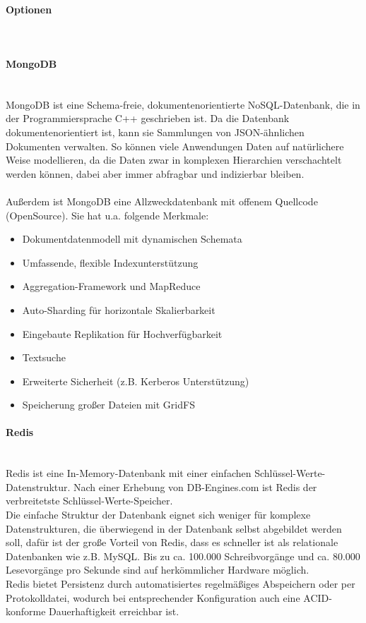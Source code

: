 \paragraph{Optionen} \mbox{}\\

\paragraph{MongoDB} \mbox{}\\
MongoDB ist eine Schema-freie, dokumentenorientierte NoSQL-Datenbank, die in der Programmiersprache C++ geschrieben ist. Da die Datenbank dokumentenorientiert ist, kann sie Sammlungen von JSON-\"ahnlichen Dokumenten verwalten. So k\"onnen viele Anwendungen Daten auf nat\"urlichere Weise modellieren, da die Daten zwar in komplexen Hierarchien verschachtelt werden k\"onnen, dabei aber immer abfragbar und indizierbar bleiben.\\\\
Au{\ss}erdem ist MongoDB eine Allzweckdatenbank mit offenem Quellcode (OpenSource).
Sie hat u.a. folgende Merkmale:

\begin{itemize}
	\item Dokumentdatenmodell mit dynamischen Schemata
	\item Umfassende, flexible Indexunterst\"utzung
	\item Aggregation-Framework und MapReduce
	\item Auto-Sharding f\"ur horizontale Skalierbarkeit
	\item Eingebaute Replikation f\"ur Hochverf\"ugbarkeit
	\item Textsuche
	\item Erweiterte Sicherheit (z.B. Kerberos Unterst\"utzung)
	\item Speicherung gro{\ss}er Dateien mit GridFS
\end{itemize}

\paragraph{Redis} \mbox{}\\
Redis ist eine In-Memory-Datenbank mit einer einfachen Schl\"ussel-Werte-Datenstruktur. Nach einer Erhebung von DB-Engines.com ist Redis der verbreitetste Schl\"ussel-Werte-Speicher.\\
Die einfache Struktur der Datenbank eignet sich weniger f\"ur komplexe Datenstrukturen, die \"uberwiegend in der Datenbank selbst abgebildet werden soll, daf\"ur ist der gro{\ss}e Vorteil von Redis, dass es schneller ist als relationale Datenbanken wie z.B. MySQL. Bis zu ca. 100.000 Schreibvorg\"ange und ca. 80.000 Lesevorg\"ange pro Sekunde sind auf herk\"ommlicher Hardware m\"oglich.\\
Redis bietet Persistenz durch automatisiertes regelm\"a{\ss}iges Abspeichern oder per Protokolldatei, wodurch bei entsprechender Konfiguration auch eine ACID-konforme Dauerhaftigkeit erreichbar ist.

